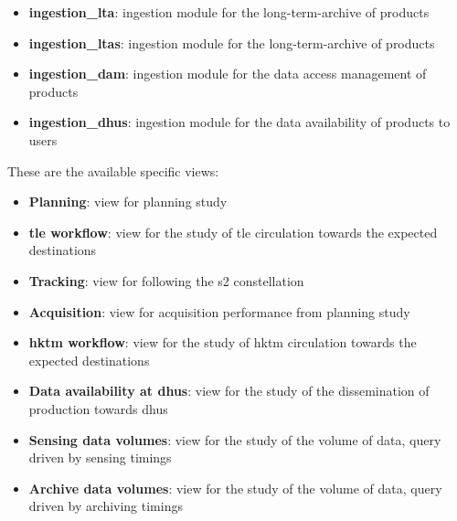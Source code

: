 \begin{itemize}
\item \textbf{ingestion\_lta}: ingestion module for the long-term-archive of products

\item \textbf{ingestion\_ltas}: ingestion module for the long-term-archive of products

\item \textbf{ingestion\_dam}: ingestion module for the data access management of products

\item \textbf{ingestion\_dhus}: ingestion module for the data availability of products to users

\end{itemize}

These are the available specific views:

\begin{itemize} 

\item \textbf{Planning}: view for planning study

\item \textbf{\acrshort{tle} workflow}: view for the study of \acrshort{tle} circulation towards the expected destinations

\item \textbf{Tracking}: view for following the \acrshort{s2} constellation
  
\item \textbf{Acquisition}: view for acquisition performance from planning study

\item \textbf{\acrshort{hktm} workflow}: view for the study of \acrshort{hktm} circulation towards the expected destinations

\item \textbf{Data availability at \acrshort{dhus}}: view for the study of the dissemination of production towards \acrshort{dhus}

\item \textbf{Sensing data volumes}: view for the study of the volume of data, query driven by sensing timings

\item \textbf{Archive data volumes}: view for the study of the volume of data, query driven by archiving timings
  
\end{itemize}
